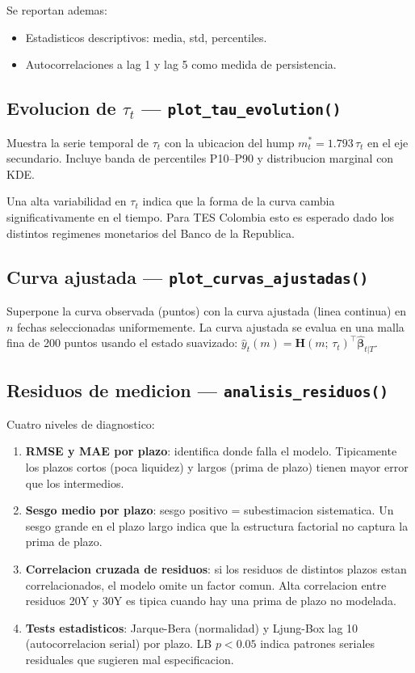 \documentclass[12pt, a4paper]{article}
\theoremstyle{plain}
\theoremstyle{definition}
\theoremstyle{remark}
\newcommand{\bbet}{\bm{\beta}}
\newcommand{\bH}{\mathbf{H}}
\begin{document}
Se reportan ademas:
\begin{itemize}[leftmargin=1.5em, itemsep=2pt]
  \item Estadisticos descriptivos: media, std, percentiles.
  \item Autocorrelaciones a lag 1 y lag 5 como medida de persistencia.
\end{itemize}

\subsection{Evolucion de $\tau_t$ --- \texttt{plot\_tau\_evolution()}}

Muestra la serie temporal de $\tau_t$ con la ubicacion del hump
$m^*_t = 1.793\,\tau_t$ en el eje secundario.
Incluye banda de percentiles P10--P90 y distribucion marginal con KDE.

Una alta variabilidad en $\tau_t$ indica que la forma de la curva
cambia significativamente en el tiempo. Para TES Colombia esto es
esperado dado los distintos regimenes monetarios del Banco de la Republica.

\subsection{Curva ajustada --- \texttt{plot\_curvas\_ajustadas()}}

Superpone la curva observada (puntos) con la curva ajustada (linea continua)
en $n$ fechas seleccionadas uniformemente. La curva ajustada se evalua
en una malla fina de 200 puntos usando el estado suavizado:
$\hat{y}_t(m) = \bH(m;\, \tau_t)^\top \hat{\bbet}_{t|T}$.

\subsection{Residuos de medicion --- \texttt{analisis\_residuos()}}

Cuatro niveles de diagnostico:

\begin{enumerate}[leftmargin=1.5em]
  \item \textbf{RMSE y MAE por plazo}: identifica donde falla el modelo.
        Tipicamente los plazos cortos (poca liquidez) y largos (prima de plazo)
        tienen mayor error que los intermedios.
  \item \textbf{Sesgo medio por plazo}: sesgo positivo = subestimacion sistematica.
        Un sesgo grande en el plazo largo indica que la estructura factorial
        no captura la prima de plazo.
  \item \textbf{Correlacion cruzada de residuos}: si los residuos de distintos
        plazos estan correlacionados, el modelo omite un factor comun.
        Alta correlacion entre residuos 20Y y 30Y es tipica cuando hay una
        prima de plazo no modelada.
  \item \textbf{Tests estadisticos}: Jarque-Bera (normalidad) y Ljung-Box lag 10
        (autocorrelacion serial) por plazo. LB $p < 0.05$ indica patrones
        seriales residuales que sugieren mal especificacion.
\end{enumerate}
\end{document}
